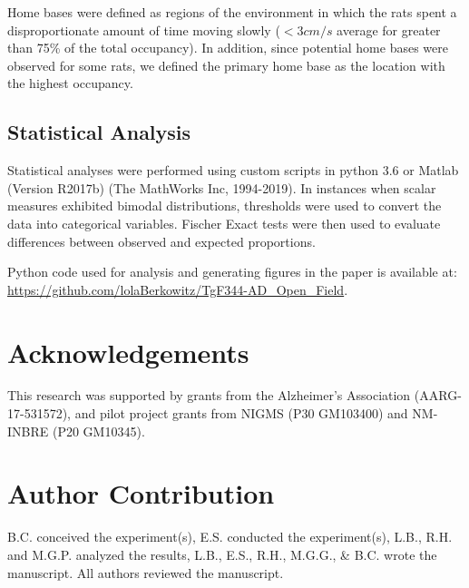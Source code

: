 \documentclass[fleqn,10pt]{wlscirep}
\begin{document}
Home bases were defined as regions of the environment in which the rats spent a disproportionate amount of time moving slowly ($<3cm/s$ average for greater than 75\% of the total occupancy). In addition, since potential home bases were observed for some rats, we defined the primary home base as the location with the highest occupancy. 

\subsection*{Statistical Analysis} 
Statistical analyses were performed using custom scripts in python 3.6 or Matlab (Version R2017b) (The MathWorks Inc, 1994-2019). In instances when scalar measures exhibited bimodal distributions, thresholds were used to convert the data into categorical variables. Fischer Exact tests were then used to evaluate differences between observed and expected proportions.

Python code used for analysis and generating figures in the paper is available at: \url{https://github.com/lolaBerkowitz/TgF344-AD_Open_Field}.






\section*{Acknowledgements}
This research was supported by grants from the Alzheimer’s Association (AARG-17-531572), and pilot project grants from NIGMS (P30 GM103400) and NM-INBRE (P20 GM10345).

\section*{Author Contribution}
B.C. conceived the experiment(s),  E.S. conducted the experiment(s), L.B., R.H. and M.G.P. analyzed the results, L.B., E.S., R.H., M.G.G., \& B.C. wrote the manuscript.  All authors reviewed the manuscript. 



\end{document}
